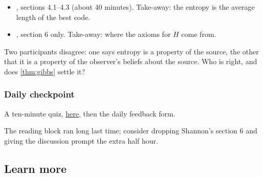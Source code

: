 \documentclass[11pt]{article}
\begin{document}
\begin{itemize}
  \item \cite[ch.~4]{MacKay:03}, sections 4.1--4.3 (about 40 minutes).
        Take-away: the entropy is the average length of the best code.
  \item \cite{Shannon:48}, section 6 only. Take-away: where the axioms for
        $H$ come from.
\end{itemize}

\begin{callout}
Two participants disagree: one says entropy is a property of the source, the
other that it is a property of the observer's beliefs about the source. Who
is right, and does \cref{thm:gibbs} settle it?
\end{callout}

\subsubsection{Daily checkpoint}
\label{sec:checkpoint}

A ten-minute quiz, \href{https://example.com/quiz}{here}, then the daily
feedback form.

\begin{teachingnote}
The reading block ran long last time; consider dropping Shannon's section 6
and giving the discussion prompt the extra half hour.
\end{teachingnote}

\subsection{Learn more}
\label{sec:learn-more}
\end{document}
